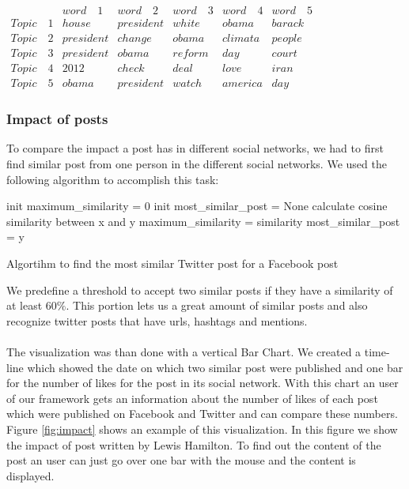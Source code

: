 $\begin{array}{c|c|c|c|c|c}
& word \quad 1 & word \quad 2 & word \quad 3 & word  \quad 4 & word \quad 5 \\ 
\hline
Topic \quad1 & house & president &  white &  obama &  barack \\ 
\hline
Topic \quad2 & president  & change  & obama  & climata  & people  \\ 
\hline
Topic \quad3 & president & obama  & reform  &  day  & court  \\ 
\hline
Topic \quad4 & 2012   &  check  &  deal & love  &  iran \\ 
\hline
Topic \quad5 &  obama & president  & watch   & america  &  day
\label{tab:exampleOutputTopicModels}
\end{array} $




\subsubsection{Impact of posts}
To compare the impact a post has in different social networks, we had to first find similar post from one person in the different social networks. We used the following algorithm to accomplish this task: \\

\begin{algorithm}
	
	{
		init maximum\_similarity = 0
		init most\_similar\_post = None
		{
			calculate cosine similarity between x and y
			{
				maximum\_similarity = similarity
				most\_similar\_post = y
			}
		}
		
	}				
	\caption{Algortihm to find the most similar Twitter post for a Facebook post}
\end{algorithm}

We predefine a threshold to accept two similar posts if they have a similarity of at least $60\%$. This portion lets us a great amount of similar posts and also recognize twitter posts that have urls, hashtags and mentions. \\
~\\
The visualization was than done with a vertical Bar Chart. We created a time-line which showed the date on which two similar post were published and one bar for the number of likes for the post in its social network. With this chart an user of our framework gets an information about the number of likes of each post which were published on Facebook and Twitter and can compare these numbers. Figure \ref{fig:impact} shows an example of this visualization. In this figure we show the impact of post written by Lewis Hamilton. To find out the content of the post an user can just go over one bar with the mouse and the content is displayed. 

